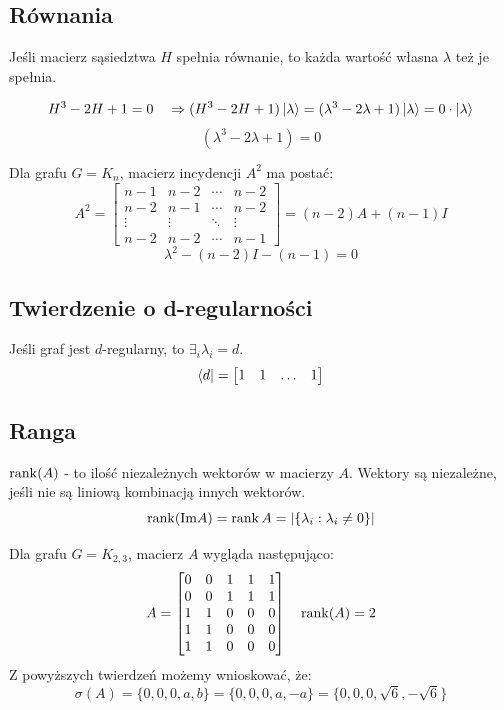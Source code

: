 \documentclass{../notatki}
\begin{document}
\subsection{Równania}

Jeśli macierz sąsiedztwa $H$ spełnia równanie, to każda wartość
własna $\lambda$ też je spełnia.

\begin{examplebox}
  $$
  H^3 - 2H + 1 = 0 \quad \Rightarrow (H^3 - 2H + 1)\ket{\lambda} = (\lambda^3 -
  2\lambda + 1)\ket{\lambda} = 0 \cdot \ket{\lambda}
  $$
  $$
  (\lambda^3 -2\lambda + 1) = 0
  $$
\end{examplebox}

\begin{examplebox}
  Dla grafu $G = K_n$, macierz incydencji $A^2$ ma postać:
  $$
  A^2 =
  \begin{bmatrix}
    n - 1 & n - 2 & \cdots & n-2 \\
    n - 2 & n - 1 & \cdots & n-2\\
    \vdots & \vdots & \ddots & \vdots \\
    n - 2 & n - 2 & \cdots & n-1
  \end{bmatrix}
  = (n - 2)A + (n-1)I
  $$
  $$
  \lambda^2 - (n-2)I - (n-1) = 0
  $$
\end{examplebox}

\subsection{Twierdzenie o d-regularności}

Jeśli graf jest $d$-regularny, to $\exists_i \lambda_i = d$.
$$
\bra{d} =
\begin{bmatrix}
  1 &
  1 &
  \hdots &
  1
\end{bmatrix}
$$

\subsection{Ranga}

$\rank(A)$ - to ilość niezależnych wektorów w macierzy $A$. Wektory
są niezależne, jeśli nie są liniową kombinacją innych wektorów.
$$
\rank(\textrm{Im} A) = \rank A = |\{\lambda_i : \lambda_i \neq 0\}|
$$

\begin{examplebox}
  Dla grafu $G = K_{2,3}$, macierz $A$ wygląda następująco:
  $$
  A =
  \begin{bmatrix}
    0 & 0 & 1 & 1 & 1 \\
    0 & 0 & 1 & 1 & 1 \\
    1 & 1 & 0 & 0 & 0 \\
    1 & 1 & 0 & 0 & 0 \\
    1 & 1 & 0 & 0 & 0 \\
  \end{bmatrix}
  \quad \rank(A) = 2
  $$
  Z powyższych twierdzeń możemy wnioskować, że:
  $$
  \sigma(A) = \{0, 0, 0, a, b\} = \{0, 0, 0, a, -a\} =
  \{0,0,0,\sqrt{6},-\sqrt{6}\}
  $$
\end{examplebox}
\end{document}

